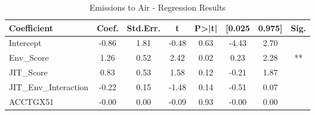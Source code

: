 \begin{table}[htbp]
    \centering
    \caption{Emissions to Air - Regression Results}
    \label{tab:regression}
    \begin{tabular}{lccccccc}
\toprule
Coefficient & Coef. & Std.Err. & t & P>|t| & [0.025 & 0.975] & Sig. \\
\midrule
Intercept & -0.86 & 1.81 & -0.48 & 0.63 & -4.43 & 2.70 &  \\
Env\_Score & 1.26 & 0.52 & 2.42 & 0.02 & 0.23 & 2.28 & ** \\
JIT\_Score & 0.83 & 0.53 & 1.58 & 0.12 & -0.21 & 1.87 &  \\
JIT\_Env\_Interaction & -0.22 & 0.15 & -1.48 & 0.14 & -0.51 & 0.07 &  \\
ACCTGX51 & -0.00 & 0.00 & -0.09 & 0.93 & -0.00 & 0.00 &  \\
\bottomrule
\end{tabular}

    \end{table}
    